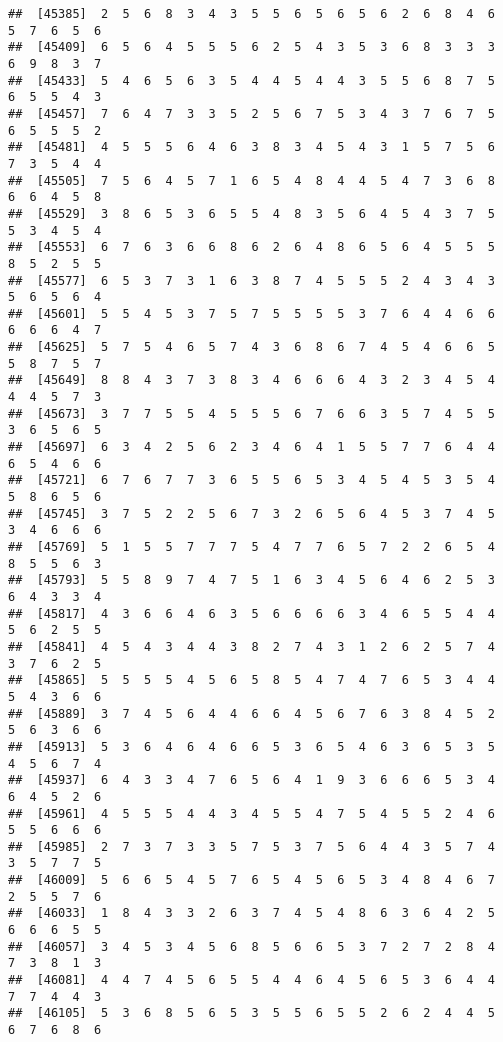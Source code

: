 \documentclass[
]{book}
\begin{document}
\begin{verbatim}
##  [45385]  2  5  6  8  3  4  3  5  5  6  5  6  5  6  2  6  8  4  6  5  7  6  5  6
##  [45409]  6  5  6  4  5  5  5  6  2  5  4  3  5  3  6  8  3  3  3  6  9  8  3  7
##  [45433]  5  4  6  5  6  3  5  4  4  5  4  4  3  5  5  6  8  7  5  6  5  5  4  3
##  [45457]  7  6  4  7  3  3  5  2  5  6  7  5  3  4  3  7  6  7  5  6  5  5  5  2
##  [45481]  4  5  5  5  6  4  6  3  8  3  4  5  4  3  1  5  7  5  6  7  3  5  4  4
##  [45505]  7  5  6  4  5  7  1  6  5  4  8  4  4  5  4  7  3  6  8  6  6  4  5  8
##  [45529]  3  8  6  5  3  6  5  5  4  8  3  5  6  4  5  4  3  7  5  5  3  4  5  4
##  [45553]  6  7  6  3  6  6  8  6  2  6  4  8  6  5  6  4  5  5  5  8  5  2  5  5
##  [45577]  6  5  3  7  3  1  6  3  8  7  4  5  5  5  2  4  3  4  3  5  6  5  6  4
##  [45601]  5  5  4  5  3  7  5  7  5  5  5  5  3  7  6  4  4  6  6  6  6  6  4  7
##  [45625]  5  7  5  4  6  5  7  4  3  6  8  6  7  4  5  4  6  6  5  5  8  7  5  7
##  [45649]  8  8  4  3  7  3  8  3  4  6  6  6  4  3  2  3  4  5  4  4  4  5  7  3
##  [45673]  3  7  7  5  5  4  5  5  5  6  7  6  6  3  5  7  4  5  5  3  6  5  6  5
##  [45697]  6  3  4  2  5  6  2  3  4  6  4  1  5  5  7  7  6  4  4  6  5  4  6  6
##  [45721]  6  7  6  7  7  3  6  5  5  6  5  3  4  5  4  5  3  5  4  5  8  6  5  6
##  [45745]  3  7  5  2  2  5  6  7  3  2  6  5  6  4  5  3  7  4  5  3  4  6  6  6
##  [45769]  5  1  5  5  7  7  7  5  4  7  7  6  5  7  2  2  6  5  4  8  5  5  6  3
##  [45793]  5  5  8  9  7  4  7  5  1  6  3  4  5  6  4  6  2  5  3  6  4  3  3  4
##  [45817]  4  3  6  6  4  6  3  5  6  6  6  6  3  4  6  5  5  4  4  5  6  2  5  5
##  [45841]  4  5  4  3  4  4  3  8  2  7  4  3  1  2  6  2  5  7  4  3  7  6  2  5
##  [45865]  5  5  5  5  4  5  6  5  8  5  4  7  4  7  6  5  3  4  4  5  4  3  6  6
##  [45889]  3  7  4  5  6  4  4  6  6  4  5  6  7  6  3  8  4  5  2  5  6  3  6  6
##  [45913]  5  3  6  4  6  4  6  6  5  3  6  5  4  6  3  6  5  3  5  4  5  6  7  4
##  [45937]  6  4  3  3  4  7  6  5  6  4  1  9  3  6  6  6  5  3  4  6  4  5  2  6
##  [45961]  4  5  5  5  4  4  3  4  5  5  4  7  5  4  5  5  2  4  6  5  5  6  6  6
##  [45985]  2  7  3  7  3  3  5  7  5  3  7  5  6  4  4  3  5  7  4  3  5  7  7  5
##  [46009]  5  6  6  5  4  5  7  6  5  4  5  6  5  3  4  8  4  6  7  2  5  5  7  6
##  [46033]  1  8  4  3  3  2  6  3  7  4  5  4  8  6  3  6  4  2  5  6  6  6  5  5
##  [46057]  3  4  5  3  4  5  6  8  5  6  6  5  3  7  2  7  2  8  4  7  3  8  1  3
##  [46081]  4  4  7  4  5  6  5  5  4  4  6  4  5  6  5  3  6  4  4  7  7  4  4  3
##  [46105]  5  3  6  8  5  6  5  3  5  5  6  5  5  2  6  2  4  4  5  6  7  6  8  6

\end{verbatim}
\end{document}
